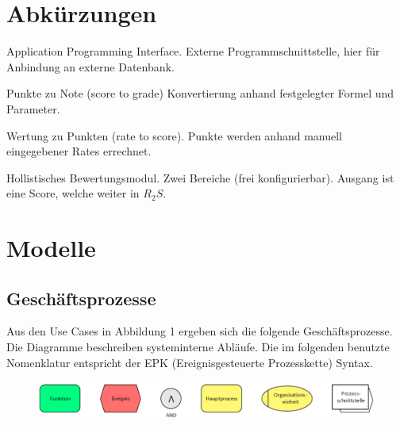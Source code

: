 \begin{appendix}
\begin{description}
	 
	\end{description}
  \section{Abkürzungen}
  
  	\begin{description}
  	\item[$API$] Application Programming Interface. Externe Programmschnittstelle, hier für Anbindung an externe Datenbank.
  	\item[$S_2G$] Punkte zu Note (score to grade) Konvertierung  anhand festgelegter Formel und Parameter.
  	\item[$R_2S$] Wertung zu Punkten (rate to score). Punkte werden anhand manuell eingegebener Rates errechnet. 
  	\item[$H_2$] Hollistisches Bewertungsmodul. Zwei Bereiche (frei konfigurierbar). Ausgang ist eine Score, welche weiter in $R_2S$.
  	
  	
  	\end{description}
  \section{Modelle}
  \subsection{Geschäftsprozesse}
  

  	Aus den Use Cases in Abbildung 1 ergeben sich die folgende Geschäftsprozesse.\\
  	Die Diagramme beschreiben systeminterne Abläufe. Die im folgenden benutzte Nomenklatur entspricht der EPK (Ereignisgesteuerte Prozesskette) Syntax.
  	
  	\begin{figure}[th!]
  	\centering
  	\includegraphics[width=\textwidth]{./img/EPK_legend}
  	\label{fig:legend}
  	\end{figure}
  	  	

\end{appendix}
